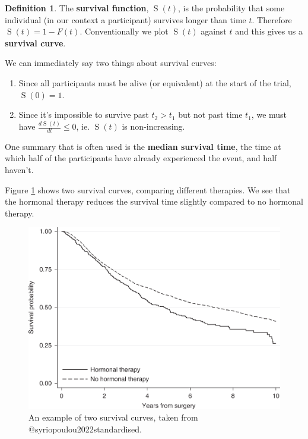 \documentclass[
  openany]{book}
\providecommand{\tightlist}{%
  \setlength{\itemsep}{0pt}\setlength{\parskip}{0pt}}
\theoremstyle{definition}
\newtheorem{definition}{Definition}[chapter]
\theoremstyle{definition}
\theoremstyle{definition}
\theoremstyle{definition}
\theoremstyle{remark}
\begin{document}
\begin{definition}
The \textbf{survival function}, \(\operatorname{S}\left(t\right)\), is the probability that some individual (in our context a participant) survives longer than time \(t\). Therefore \(\operatorname{S}\left(t\right) = 1 - F(t)\).
Conventionally we plot \(\operatorname{S}\left(t\right)\) against \(t\) and this gives us a \textbf{survival curve}.
\end{definition}

We can immediately say two things about survival curves:

\begin{enumerate}
\def\labelenumi{\arabic{enumi}.}
\tightlist
\item
  Since all participants must be alive (or equivalent) at the start of the trial, \(\operatorname{S}\left(0\right)=1\).
\item
  Since it's impossible to survive past \(t_2>t_1\) but not past time \(t_1\), we must have \(\frac{d\operatorname{S}\left(t\right)}{dt}\leq{0}\), ie. \(\operatorname{S}\left(t\right)\) is non-increasing.
\end{enumerate}

One summary that is often used is the \textbf{median survival time}, the time at which half of the participants have already experienced the event, and half haven't.

Figure \ref{fig:egsurvival} shows two survival curves, comparing different therapies. We see that the hormonal therapy reduces the survival time slightly compared to no hormonal therapy.

\begin{figure}
\includegraphics[width=13.93in]{images/survival_eg} \caption{An example of two survival curves, taken from @syriopoulou2022standardised.}\label{fig:egsurvival}
\end{figure}
\end{document}
